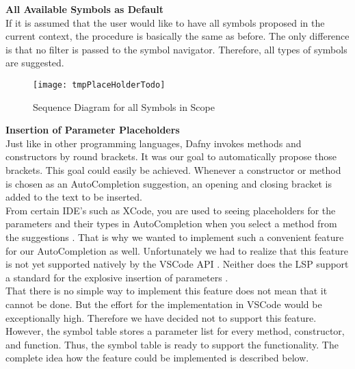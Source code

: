 \textbf{All Available Symbols as Default}\\
If it is assumed that the user would like to have all symbols proposed in the current context,
the procedure is basically the same as before.
The only difference is that no filter is passed to the symbol navigator.
Therefore, all types of symbols are suggested.

\begin{figure}[H]
    \centering
    \texttt{[image: tmpPlaceHolderTodo]}
    \caption{Sequence Diagram for all Symbols in Scope}
    \label{fig:default_completion_diagram}
\end{figure}


\textbf{Insertion of Parameter Placeholders}\\
Just like in other programming languages, Dafny invokes methods and constructors by round brackets.
It was our goal to automatically propose those brackets.
This goal could easily be achieved.
Whenever a constructor or method is chosen as an AutoCompletion suggestion,
an opening and closing bracket is added to the text to be inserted. \\

From certain IDE's such as XCode,
you are used to seeing placeholders for the parameters and their types in AutoCompletion
when you select a method from the suggestions \cite{sa}.
That is why we wanted to implement such a convenient feature for our AutoCompletion as well.
Unfortunately we had to realize that this feature is not yet supported natively by the VSCode API \cite{vscodeAPI}.
Neither does the LSP support a standard for the explosive insertion of parameters \cite{lspspec}. \\

That there is no simple way to implement this feature does not mean that it cannot be done.
But the effort for the implementation in VSCode would be exceptionally high.
Therefore we have decided not to support this feature.
However, the symbol table stores a parameter list for every method, constructor, and function.
Thus, the symbol table is ready to support the functionality.
The complete idea how the feature could be implemented is described below. \\

